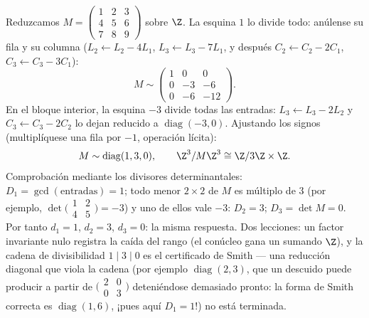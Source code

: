 \begin{example}
\label{ex:b3:modules:smithworked}
Reduzcamos $M = \begin{pmatrix} 1 & 2 & 3\\ 4 & 5 & 6\\ 7 & 8 & 9
\end{pmatrix}$ sobre $\Z$. La esquina $1$ lo divide todo: anúlense su
fila y su columna ($L_2 \leftarrow L_2 - 4L_1$, $L_3
\leftarrow L_3 - 7L_1$, y después $C_2 \leftarrow C_2 - 2C_1$, $C_3
\leftarrow C_3 - 3C_1$):
\[
M \sim \begin{pmatrix} 1 & 0 & 0\\ 0 & -3 & -6\\ 0 & -6 & -12
\end{pmatrix} .
\]
En el bloque interior, la esquina $-3$ divide todas las entradas: $L_3
\leftarrow L_3 - 2L_2$ y $C_3 \leftarrow C_3 - 2C_2$ lo dejan reducido a
$\operatorname{diag}(-3, 0)$. Ajustando los signos (multiplíquese una
fila por $-1$, operación lícita):
\[
M \sim \operatorname{diag}(1, 3, 0),
\qquad
\Z^3/M\Z^3 \cong \Z/3\Z \times \Z .
\]
Comprobación mediante los divisores determinantales: $D_1 =
\gcd(\text{entradas}) = 1$; todo menor $2\times2$ de $M$ es múltiplo de
$3$ (por ejemplo, $\det\bigl(\begin{smallmatrix}1 & 2\\ 4
& 5\end{smallmatrix}\bigr) = -3$) y uno de ellos vale $-3$: $D_2 =
3$; $D_3 = \det M = 0$. Por tanto $d_1 = 1$, $d_2 = 3$, $d_3 = 0$: la
misma respuesta. Dos lecciones: un factor invariante nulo registra la
caída del rango (el conúcleo gana un sumando
 $\Z$), y la cadena de divisibilidad
$1 \mid 3 \mid 0$ es el certificado de Smith --- una reducción diagonal
que viola la cadena (por ejemplo $\operatorname{diag}(2, 3)$, que un
descuido puede producir a partir de
$\bigl(\begin{smallmatrix}2 & 0\\ 0 &
3\end{smallmatrix}\bigr)$ deteniéndose demasiado pronto: la forma de
Smith correcta es $\operatorname{diag}(1, 6)$, ¡pues aquí $D_1 = 1$!) no
está terminada.
\end{example}

